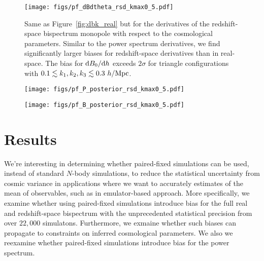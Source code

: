 \begin{figure}
\begin{center}
    \texttt{[image: figs/pf\_dBdtheta\_rsd\_kmax0\_5.pdf]}
    \caption{Same as Figure~\ref{fig:dbk_real} but for the derivatives of the
    redshift-space bispectrum monopole with respect to the cosmological parameters. 
    Similar to the power spectrum derivatives, we find significantly larger biases
    for redshift-space derivatives than in real-space. The bias for 
    ${\rm d} B_0/{\rm d}h$ exceeds $2\sigma$ for triangle configurations with 
    $0.1 \lesssim k_1, k_2, k_3 \lesssim 0.3~h/{\rm Mpc}$.  
    }
\label{fig:dbk_rsd}
\end{center}
\end{figure}

\begin{figure}
\begin{center}
    \texttt{[image: figs/pf\_P\_posterior\_rsd\_kmax0\_5.pdf]}
    \caption{}
\label{fig:ppost_rsd}
\end{center}
\end{figure}

\begin{figure}
\begin{center}
    \texttt{[image: figs/pf\_B\_posterior\_rsd\_kmax0\_5.pdf]}
    \caption{}
\label{fig:bpost_rsd}
\end{center}
\end{figure}

\section{Results} \label{sec:results} 
We're interesting in determining whether paired-fixed simulations can be used, instead of
standard $N$-body simulations, to reduce the statistical uncertainty from cosmic variance 
in applications where we want to accurately estimates of the mean of observables, such as
in emulator-based approach. More specifically, we examine whether using paired-fixed 
simulations introduce bias for the full real and redshift-space bispectrum with the 
unprecedented statistical precision from over $22,000$ \quij simulatons. Furthermore,
we exmaine whether such biases can propagate to constraints on inferred cosmological 
parameters. We also we reexamine whether paired-fixed simulations introduce bias for
the power spectrum. 

